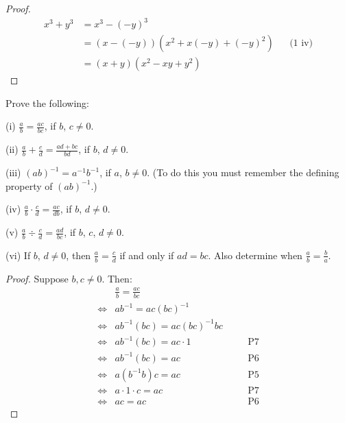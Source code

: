 \begin{proof}
    \begin{align*}
        x^3 + y^3 &= x^3 - {(-y)}^3 && \text{} \\
                  &= (x - (-y))(x^2 + x(-y) + {(-y)}^2)  && \text{(1 iv)} \\
                  &= (x + y)(x^2 - xy + y^2)  && \text{}
    \end{align*}
\end{proof}

\begin{tcolorbox}[title=Problem 3, breakable]
    Prove the following:

    (i) $\frac{a}{b} = \frac{ac}{bc}$, if $b$, $c \not = 0$.

    (ii) $\frac{a}{b} + \frac{c}{d} = \frac{ad + bc}{bd}$, if $b$, $d \not = 0$.

    (iii) ${(ab)}^{-1} = a^{-1}b^{-1}$, if $a$, $b \not = 0$. (To do this 
    you must remember the defining property of ${(ab)}^{-1}$.)

    (iv) $\frac{a}{b} \cdot \frac{c}{d} = \frac{ac}{db}$, if $b$, $d \not = 0$.

    (v) $\frac{a}{b} \div \frac{c}{d} = \frac{ad}{bc}$, if $b$, $c$, $d \not = 0$.

    (vi) If $b$, $d \not = 0$, then $\frac{a}{b} = \frac{c}{d}$ if and only if 
    $ad = bc$. Also determine when $\frac{a}{b} = \frac{b}{a}$.
\end{tcolorbox}

\begin{proof}
    Suppose $b,c \not = 0$. Then:
    \begin{align*}
        &\frac{a}{b} = \frac{ac}{bc} \\
        \iff& ab^{-1} = ac(bc)^{-1} && \\
        \iff& ab^{-1}(bc) = ac(bc)^{-1}bc &&\quad \text{} \\
        \iff& ab^{-1}(bc) = ac \cdot 1 &&\quad \text{P7} \\
        \iff& ab^{-1}(bc) = ac &&\quad \text{P6} \\
        \iff& a(b^{-1}b)c = ac &&\quad \text{P5} \\
        \iff& a \cdot 1 \cdot c = ac &&\quad \text{P7} \\
        \iff& ac = ac &&\quad \text{P6} 
    \end{align*}
\end{proof}

